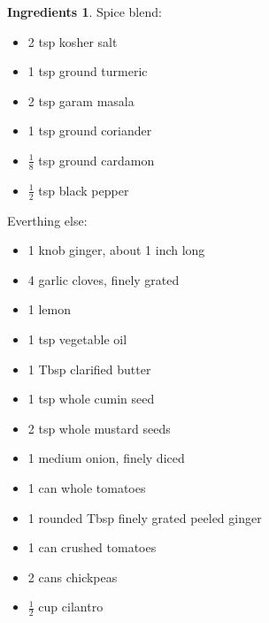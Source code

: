 \documentclass[a4paper,12pt]{scrreprt}
\theoremstyle{definition}
\newtheorem*{ingredients}{Ingredients}
\theoremstyle{plain}
\theoremstyle{remark}
\begin{document}
\begin{ingredients}

  \leavevmode
  Spice blend:
  \begin{multicols}{2}
    \begin{itemize}
      \item 2 tsp kosher salt

      \item 1 tsp ground turmeric

      \item 2 tsp garam masala

      \item 1 tsp ground coriander

      \item $\tfrac{1}{8}$ tsp ground cardamon

      \item $\tfrac{1}{2}$ tsp black pepper
    \end{itemize}
  \end{multicols}
  Everthing else:
  \begin{multicols}{2}
    \begin{itemize}
      \item 1 knob ginger, about 1 inch long

      \item 4 garlic cloves, finely grated

      \item 1 lemon

      \item 1 tsp vegetable oil

      \item 1 Tbsp clarified butter

      \item 1 tsp whole cumin seed

      \item 2 tsp whole mustard seeds

      \item 1 medium onion, finely diced

      \item 1 can whole tomatoes

      \item 1 rounded Tbsp finely grated peeled ginger

      \item 1 can crushed tomatoes

      \item 2 cans chickpeas

      \item $\frac{1}{2}$ cup cilantro
    \end{itemize}
  \end{multicols}
\end{ingredients}
\end{document}
